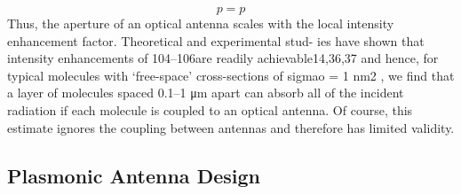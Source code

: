 	\begin{equation}
		p=p
	\end{equation}
	Thus, the aperture of an optical antenna scales with the local intensity enhancement factor. Theoretical and experimental stud- ies have shown that intensity enhancements of 104–106are readily achievable14,36,37 and hence, for typical molecules with ‘free-space’ cross-sections of sigmao = 1 nm2 , we find that a layer of molecules spaced 0.1–1 μm apart can absorb all of the incident radiation if each molecule is coupled to an optical antenna. Of course, this estimate ignores the coupling between antennas and therefore has limited validity.
	


	\subsection{Plasmonic Antenna Design} \label{sec::structure_antenna}

